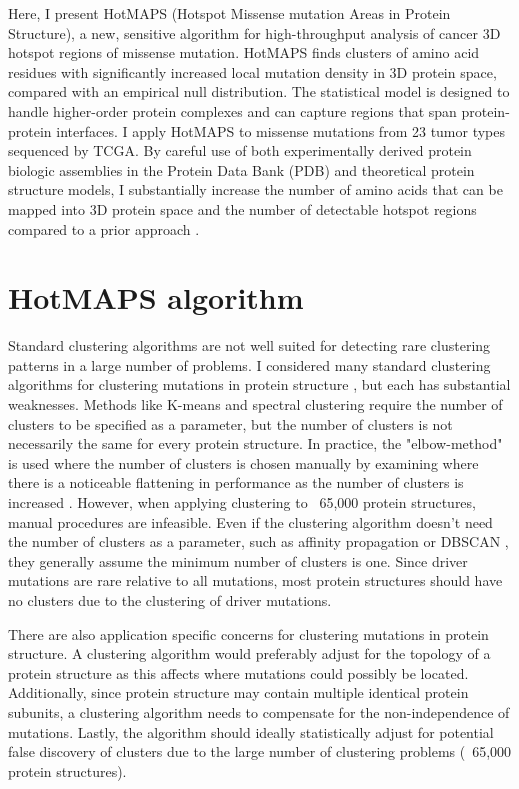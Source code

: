 Here, I present HotMAPS (Hotspot Missense mutation Areas in Protein Structure), a new, sensitive algorithm for high-throughput analysis of cancer 3D hotspot regions of missense mutation. HotMAPS finds clusters of amino acid residues with significantly increased local mutation density in 3D protein space, compared with an empirical null distribution. The statistical model is designed to handle higher-order protein complexes and can capture regions that span protein-protein interfaces. I apply HotMAPS to missense mutations from 23 tumor types sequenced by TCGA. By careful use of both experimentally derived protein biologic assemblies in the Protein Data Bank (PDB) and theoretical protein structure models, I substantially increase the number of amino acids that can be mapped into 3D protein space and the number of detectable hotspot regions compared to a prior approach \cite{RN105}.

\section{HotMAPS algorithm}

Standard clustering algorithms are not well suited for detecting rare clustering patterns in a large number of problems. I considered many standard clustering algorithms for clustering mutations in protein structure \cite{RN117, RN114, RN115, RN116}, but each has substantial weaknesses. Methods like K-means and spectral clustering require the number of clusters to be specified as a parameter, but the number of clusters is not necessarily the same for every protein structure. In practice, the "elbow-method" is used where the number of clusters is chosen manually by examining where there is a noticeable flattening in performance as the number of clusters is increased \cite{RN118}. However, when applying clustering to ~65,000 protein structures, manual procedures are infeasible. Even if the clustering algorithm doesn't need the number of clusters as a parameter, such as affinity propagation \cite{RN114} or DBSCAN \cite{RN117}, they generally assume the minimum number of clusters is one. Since driver mutations are rare relative to all mutations, most protein structures should have no clusters due to the clustering of driver mutations.

There are also application specific concerns for clustering mutations in protein structure. A clustering algorithm would preferably adjust for the topology of a protein structure as this affects where mutations could possibly be located. Additionally, since protein structure may contain multiple identical protein subunits, a clustering algorithm needs to compensate for the non-independence of mutations. Lastly, the algorithm should ideally statistically adjust for potential false discovery of clusters due to the large number of clustering problems (~65,000 protein structures). 

